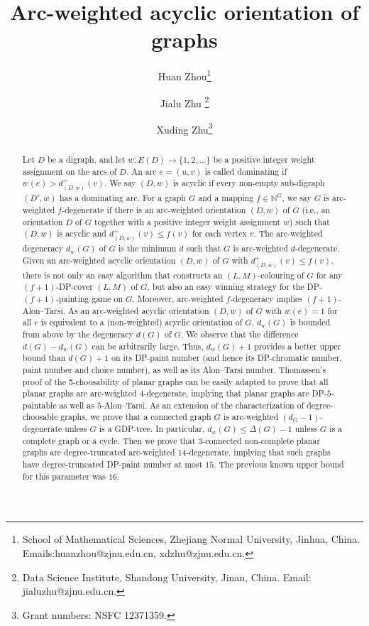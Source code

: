 \documentclass[11pt,a4paper]{article}
\theoremstyle{definition}
\begin{document}
	\title{ Arc-weighted acyclic orientation of graphs}
		\author{Huan Zhou\thanks{School of Mathematical Sciences, Zhejiang Normal University, Jinhua, China. Emails:huanzhou@zjnu.edu.cn, xdzhu@zjnu.edu.cn.}
\and
Jialu Zhu \thanks{Data Science Institute, Shandong University, Jinan, China. Email: jialuzhu@zjnu.edu.cn.}
\and
Xuding Zhu\footnotemark[1]\thanks{Grant numbers: NSFC 12371359.}}

        \maketitle
        
	\begin{abstract}
  Let $D$ be a digraph, and let $w: E(D) \to \{1,2,\ldots \}$ be a positive integer weight assignment on the arcs of $D$.  An arc $e=(u,v)$ is called dominating if $w(e) > d_{(D,w)}^+(v)$.  We say $(D,w)$ is acyclic if every non-empty sub-digraph $(D', w)$ has a dominating arc.  
 For a graph $G$ and a mapping $f \in \mathbb{N}^G$, we say  $G$ is {arc-weighted $f$-degenerate}  if there is an arc-weighted orientation $(D, w)$ of $G$ (i.e., an orientation $D$ of $G$ together with a positive integer weight assignment $w$) such that $(D,w)$ is acyclic and  $d_{(D,w)}^+(v) \le f(v)$ for each vertex $v$. The arc-weighted   degeneracy $d_{w}(G)$ of $G$ is the minimum $d$ such that $G$ is  arc-weighted   $d$-degenerate.  
   Given an arc-weighted acyclic orientation $(D,w)$ of $G$ with $d_{(D,w)}^+(v) \le  f(v)$,  there is not only an easy algorithm that constructs an $(L,M)$-colouring of $G$ for any $(f+1)$-DP-cover $(L,M)$ of $G$, but also an easy winning strategy for the DP-$(f+1)$-painting game on $G$. Moreover, arc-weighted  $f$-degeneracy implies $(f+1)$-Alon--Tarsi. As an arc-weighted acyclic orientation $(D,w)$ of $G$ with $w(e)=1$ for all $e$ is equivalent to a (non-weighted)  acyclic orientation of $G$, $d_{w}(G)$ is bounded from above by the degeneracy $d(G)$ of $G$. We observe that the difference $d(G)-d_{w}(G)$ can be arbitrarily large.
 Thus, $d_{w}(G)+1$ provides a better upper bound than $d(G)+1$ on its DP-paint number (and hence its DP-chromatic number, paint number and choice number), as well as its Alon--Tarsi number. Thomassen's proof of the 5-choosability of planar graphs can be easily adapted to prove  that all planar graphs are arc-weighted   $4$-degenerate, implying that planar graphs are DP-$5$-paintable as well as $5$-Alon--Tarsi. As an extension of the characterization of degree-choosable graphs, we prove that a connected graph $G$ is arc-weighted  $(d_G-1)$-degenerate unless $G$ is a GDP-tree. In particular, $d_{w}(G) \le \Delta(G)-1$ unless $G$ is a complete graph or a cycle.  
   Then we prove that 3-connected non-complete planar graphs are degree-truncated arc-weighted   $14$-degenerate, implying that such graphs have degree-truncated DP-paint number at most $15$. The previous known upper bound for this parameter was $16$.   
	\end{abstract}
	
\end{document}

